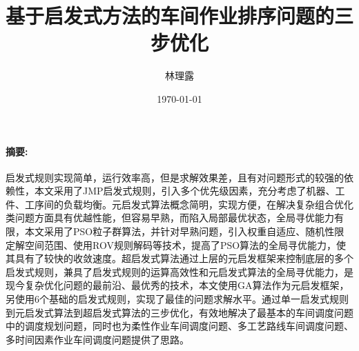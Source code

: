 \documentclass[UTF8]{ctexart}
\title{\huge 基于启发式方法的车间作业排序问题的三步优化}
\author{林理露}
\date{\today}
\begin{document}
\maketitle
\paragraph{摘要:}启发式规则实现简单，运行效率高，但是求解效果差，且有对问题形式的较强的依赖性，本文采用了JMP启发式规则，引入多个优先级因素，充分考虑了机器、工件、工序间的负载均衡。元启发式算法概念简明，实现方便，在解决复杂组合优化类问题方面具有优越性能，但容易早熟，而陷入局部最优状态，全局寻优能力有限，本文采用了PSO粒子群算法，并针对早熟问题，引入权重自适应、随机性限定解空间范围、使用ROV规则解码等技术，提高了PSO算法的全局寻优能力，使其具有了较快的收敛速度。超启发式算法通过上层的元启发框架来控制底层的多个启发式规则，兼具了启发式规则的运算高效性和元启发式算法的全局寻优能力，是现今复杂优化问题的最前沿、最优秀的技术，本文使用GA算法作为元启发框架，另使用6个基础的启发式规则，实现了最佳的问题求解水平。通过单一启发式规则到元启发式算法到超启发式算法的三步优化，有效地解决了最基本的车间调度问题中的调度规划问题，同时也为柔性作业车间调度问题、多工艺路线车间调度问题、多时间因素作业车间调度问题提供了思路。
\end{document}
